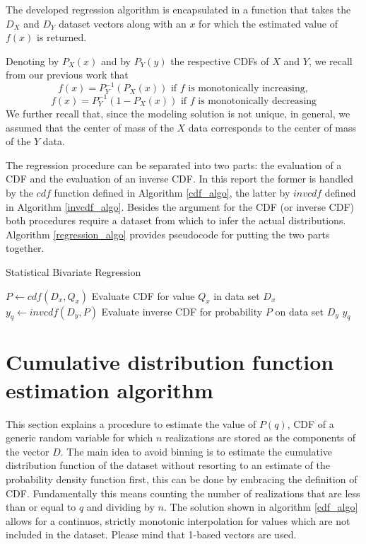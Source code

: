 \documentclass[10pt,final]{siamltex}
\begin{document}
The developed regression algorithm is encapsulated in a function that takes the $D_X$ and $D_Y$ dataset vectors along with an $x$ for which the estimated value of $f(x)$ is returned.

Denoting by $P_X(x)$ and by $P_Y(y)$ the respective CDFs of $X$ and $Y$, we recall from our previous work that
\begin{equation}
f(x)=P_Y^{-1}(P_X(x)) \text{ if $f$ is monotonically increasing},
\end{equation}
\begin{equation}
f(x)=P_Y^{-1}(1-P_X(x)) \text{ if $f$ is monotonically decreasing}
\end{equation}
We further recall that, since the modeling solution is not unique, in general, we assumed that the center of mass of the $X$ data corresponds to the center of mass of the $Y$ data.

The regression procedure can be separated into two parts: the evaluation of a CDF and the evaluation of an inverse CDF. In this report the former is handled by the $cdf$ function defined in Algorithm \ref{cdf_algo}, the latter by $invcdf$ defined in Algorithm \ref{invcdf_algo}. Besides the argument for the CDF (or inverse CDF) both procedures require a dataset from which to infer the actual distributions. Algorithm \ref{regression_algo} provides pseudocode for putting the two parts together.

\begin{algorithm}
  \caption{Statistical Bivariate Regression}
  \label{regression_algo}
  \begin{algorithmic}[1]
    \State $P \gets cdf(D_x, Q_x)$
    \Comment Evaluate CDF for value $Q_x$ in data set $D_x$
    \State $y_q \gets invcdf(D_y, P)$
    \Comment Evaluate inverse CDF for probability $P$ on data set $D_y$
    \State \Return $y_q$
    \EndFunction
\end{algorithmic}
\end{algorithm}

\section{Cumulative distribution function estimation algorithm}
%
This section explains a procedure to estimate the value of $P(q)$, CDF of a generic random variable for which $n$ realizations are stored as the components of the vector $D$.
The main idea to avoid binning is to estimate the cumulative distribution function of the dataset without resorting to an estimate of the probability density function first, this can be done by embracing the definition of CDF. Fundamentally this means counting the number of realizations that are less than or equal to $q$ and dividing by $n$. The solution shown in algorithm \ref{cdf_algo} allows for a continuos, strictly monotonic interpolation for values which are not included in the dataset. Please mind that 1-based vectors are used.
\end{document}
